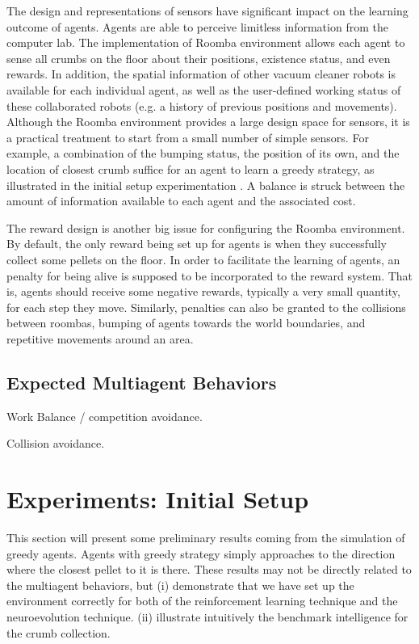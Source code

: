 \documentclass[conference]{IEEEtran}
\begin{document}
The design and representations of sensors have significant impact on the
learning outcome of agents.
Agents are able to perceive limitless information from the computer lab. 
The implementation of Roomba environment allows each agent to sense all crumbs on
the floor about their positions, existence status, and even rewards. In
addition, the spatial information of other vacuum cleaner robots is available
for each individual agent, as well as the user-defined working status of these 
collaborated robots (e.g. a history of previous positions and movements).
Although the Roomba environment provides a large design space for sensors, it
is a practical treatment to start from a small number of
simple sensors. For example, a combination of the bumping status, the position of
its own, and the location of closest crumb suffice for an agent to learn a
greedy strategy, as illustrated in the initial setup experimentation .
A balance is struck between the amount of information available to each agent
and the associated cost.

The reward design is another big issue for
configuring the Roomba environment. By default, the only reward being set up
for agents is when they successfully collect some pellets on the floor. In
order to facilitate the learning of agents, an penalty for being alive is
supposed to be incorporated to the reward system. That is, agents should
receive some negative rewards, typically a very small quantity, for each step
they move. Similarly, penalties can also be granted to the collisions between
roombas, bumping of agents towards the world boundaries, and repetitive
movements around an area.


\subsection{Expected Multiagent Behaviors}
Work Balance / competition avoidance. 

Collision avoidance. 


\section{Experiments: Initial Setup}
This section will present some preliminary results coming from the simulation
of greedy agents. Agents with greedy strategy simply approaches to the direction
where the closest pellet to it is there.  These results may not be directly
related to the multiagent behaviors, but 
(i) demonstrate that we have set up the environment correctly for both
of the reinforcement learning technique and the neuroevolution technique. 
(ii) illustrate intuitively the benchmark intelligence for the crumb
collection.
\end{document}
